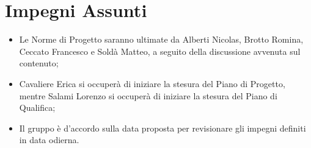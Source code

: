 \documentclass[a4paper, 12pt]{article}
\begin{document}
\section*{Impegni Assunti}
\begin{itemize}
    \item Le Norme di Progetto saranno ultimate da Alberti Nicolas, Brotto Romina, Ceccato Francesco e Soldà Matteo, a seguito della discussione avvenuta sul contenuto;
    \item Cavaliere Erica si occuperà di iniziare la stesura del Piano di Progetto, mentre Salami Lorenzo si occuperà di iniziare la stesura del Piano di Qualifica;
    \item Il gruppo è d'accordo sulla data proposta per revisionare gli impegni definiti in data odierna.
\end{itemize}
\end{document}
